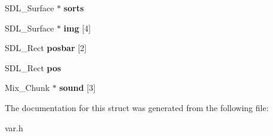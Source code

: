 \begin{DoxyCompactItemize}
\item 
\hypertarget{structhero_ae8d4955065cf897267f809eb17733f26}{S\-D\-L\-\_\-\-Surface $\ast$ {\bfseries sorts}}\label{structhero_ae8d4955065cf897267f809eb17733f26}

\item 
\hypertarget{structhero_aa09f87dd0d64114b9fe64aadeac55088}{S\-D\-L\-\_\-\-Surface $\ast$ {\bfseries img} \mbox{[}4\mbox{]}}\label{structhero_aa09f87dd0d64114b9fe64aadeac55088}

\item 
\hypertarget{structhero_afc7c4d700727e72d130352a2f0aa9291}{S\-D\-L\-\_\-\-Rect {\bfseries posbar} \mbox{[}2\mbox{]}}\label{structhero_afc7c4d700727e72d130352a2f0aa9291}

\item 
\hypertarget{structhero_a294c5492db3ece725b68947cafdaafec}{S\-D\-L\-\_\-\-Rect {\bfseries pos}}\label{structhero_a294c5492db3ece725b68947cafdaafec}

\item 
\hypertarget{structhero_a3f0acd84df740756106b11dbb208d28b}{Mix\-\_\-\-Chunk $\ast$ {\bfseries sound} \mbox{[}3\mbox{]}}\label{structhero_a3f0acd84df740756106b11dbb208d28b}

\end{DoxyCompactItemize}


The documentation for this struct was generated from the following file\-:\begin{DoxyCompactItemize}
\item 
var.\-h\end{DoxyCompactItemize}
